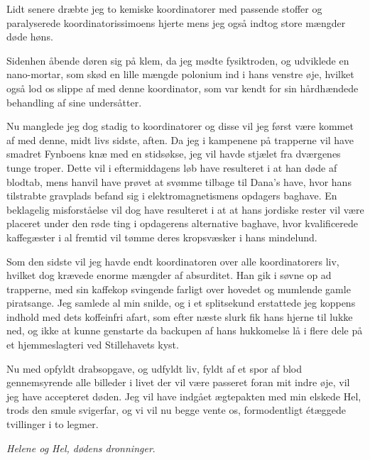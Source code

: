 \begin{minipage}[t]{150mm}
Lidt senere dræbte jeg to kemiske koordinatorer med passende stoffer og paralyserede koordinatorissimoens hjerte mens jeg også indtog store mængder døde høns.

Sidenhen åbende døren sig på klem, da jeg mødte fysiktroden, og udviklede en nano-mortar, som skød en lille mængde polonium ind i hans venstre øje, hvilket også lod os slippe af med denne koordinator, som var kendt for sin hårdhændede behandling af sine undersåtter.

Nu manglede jeg dog stadig to koordinatorer og disse vil jeg først være kommet af med denne, midt livs sidste, aften. Da jeg i kampenene på trapperne vil have smadret Fynboens knæ med en stidsøkse, jeg vil havde stjælet fra dværgenes tunge troper. Dette vil i eftermiddagens løb have resulteret i at han døde af blodtab, mens hanvil have prøvet at svømme tilbage til Dana's have, hvor hans tilstrabte gravplads befand sig i elektromagnetismens opdagers baghave. En beklagelig misforståelse vil dog have resulteret i at at hans jordiske rester vil være placeret under den røde ting i opdagerens alternative baghave, hvor kvalificerede kaffegæster i al fremtid vil tømme deres kropsvæsker i hans mindelund.

Som den sidste vil jeg havde endt koordinatoren over alle koordinatorers liv, hvilket dog krævede enorme mængder af absurditet. Han gik i søvne op ad trapperne, med sin kaffekop svingende farligt over hovedet og mumlende gamle piratsange. Jeg samlede al min snilde, og i et splitsekund erstattede jeg koppens indhold med dets koffeinfri afart, som efter næste slurk fik hans hjerne til lukke ned, og ikke at kunne genstarte da backupen af hans hukkomelse lå i flere dele på et hjemmeslagteri ved Stillehavets kyst.

Nu med opfyldt drabsopgave, og udfyldt liv, fyldt af et spor af blod gennemsyrende alle billeder i livet der vil være passeret foran mit indre øje, vil jeg have accepteret døden. Jeg vil have indgået ægtepakten med min elskede Hel, trods den smule svigerfar, og vi vil nu begge vente os, formodentligt étæggede tvillinger i to legmer. 

\emph{Helene og Hel, dødens dronninger}. 

\end{minipage}
